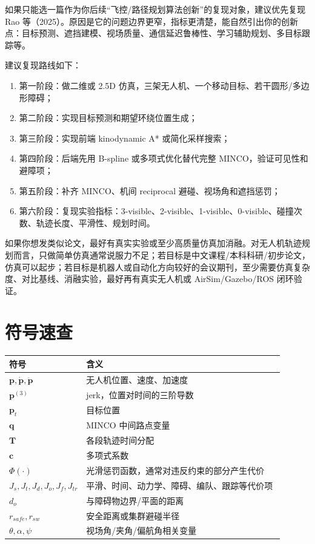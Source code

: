 ﻿\documentclass[UTF8,a4paper,11pt]{ctexart}
\newcommand{\Rao}{Rao 等（2025）}
\begin{document}
如果只能选一篇作为你后续“飞控/路径规划算法创新”的复现对象，建议优先复现 \Rao{}。原因是它的问题边界更窄，指标更清楚，能自然引出你的创新点：目标预测、遮挡建模、视场质量、通信延迟鲁棒性、学习辅助规划、多目标跟踪等。

建议复现路线如下：
\begin{enumerate}
  \item 第一阶段：做二维或 2.5D 仿真，三架无人机、一个移动目标、若干圆形/多边形障碍；
  \item 第二阶段：实现目标预测和期望环绕位置生成；
  \item 第三阶段：实现前端 kinodynamic A* 或简化采样搜索；
  \item 第四阶段：后端先用 B-spline 或多项式优化替代完整 MINCO，验证可见性和避障项；
  \item 第五阶段：补齐 MINCO、机间 reciprocal 避碰、视场角和遮挡惩罚；
  \item 第六阶段：复现实验指标：3-visible、2-visible、1-visible、0-visible、碰撞次数、轨迹长度、平滑性、规划时间。
\end{enumerate}

如果你想发类似论文，最好有真实实验或至少高质量仿真加消融。对无人机轨迹规划而言，只做简单仿真通常说服力不足；若目标是中文课程/本科科研/初步论文，仿真可以起步；若目标是机器人或自动化方向较好的会议期刊，至少需要仿真复杂度、对比基线、消融实验，最好再有真实无人机或 AirSim/Gazebo/ROS 闭环验证。

\section{符号速查}

\begin{longtable}{p{0.18\linewidth}p{0.72\linewidth}}
\toprule
符号 & 含义 \\
\midrule
$\bm p,\dot{\bm p},\ddot{\bm p}$ & 无人机位置、速度、加速度 \\
$\bm p^{(3)}$ & jerk，位置对时间的三阶导数 \\
$\bm p_t$ & 目标位置 \\
$\bm q$ & MINCO 中间路点变量 \\
$\bm T$ & 各段轨迹时间分配 \\
$\bm c$ & 多项式系数 \\
$\Phi(\cdot)$ & 光滑惩罚函数，通常对违反约束的部分产生代价 \\
$J_s,J_t,J_d,J_o,J_f,J_{tr}$ & 平滑、时间、动力学、障碍、编队、跟踪等代价项 \\
$d_o$ & 与障碍物边界/平面的距离 \\
$r_{safe},r_{sw}$ & 安全距离或集群避碰半径 \\
$\theta,\alpha,\psi$ & 视场角/夹角/偏航角相关变量 \\
\bottomrule
\end{longtable}
\end{document}
